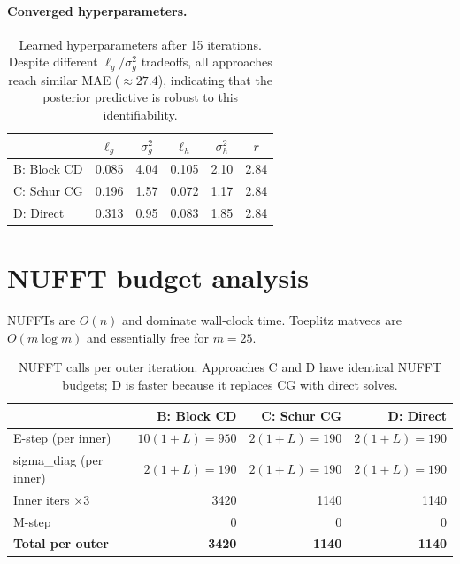 \documentclass[11pt]{article}
\begin{document}
\paragraph{Converged hyperparameters.}
\begin{table}[h]
\centering
\begin{tabular}{@{}lccccc@{}}
\toprule
& $\ell_g$ & $\sigma_g^2$ & $\ell_h$ & $\sigma_h^2$ & $r$ \\
\midrule
B: Block CD & 0.085 & 4.04 & 0.105 & 2.10 & 2.84 \\
C: Schur CG & 0.196 & 1.57 & 0.072 & 1.17 & 2.84 \\
D: Direct & 0.313 & 0.95 & 0.083 & 1.85 & 2.84 \\
\bottomrule
\end{tabular}
\caption{Learned hyperparameters after 15 iterations.
  Despite different $\ell_g / \sigma_g^2$ tradeoffs, all approaches
  reach similar MAE (${\approx}27.4$), indicating that the posterior
  predictive is robust to this identifiability.}
\end{table}

\section{NUFFT budget analysis}

NUFFTs are $O(n)$ and dominate wall-clock time. Toeplitz matvecs
are $O(m\log m)$ and essentially free for $m{=}25$.

\begin{table}[h]
\centering
\begin{tabular}{@{}lrrr@{}}
\toprule
& \textbf{B: Block CD} & \textbf{C: Schur CG} & \textbf{D: Direct} \\
\midrule
E-step (per inner) & $10(1{+}L)=950$ & $2(1{+}L)=190$ & $2(1{+}L)=190$ \\
sigma\_diag (per inner) & $2(1{+}L)=190$ & $2(1{+}L)=190$ & $2(1{+}L)=190$ \\
Inner iters $\times 3$ & 3420 & 1140 & 1140 \\
M-step & 0 & 0 & 0 \\
\midrule
\textbf{Total per outer} & \textbf{3420} & \textbf{1140} & \textbf{1140} \\
\bottomrule
\end{tabular}
\caption{NUFFT calls per outer iteration. Approaches C and D have identical
NUFFT budgets; D is faster because it replaces CG with direct solves.}
\end{table}
\end{document}
